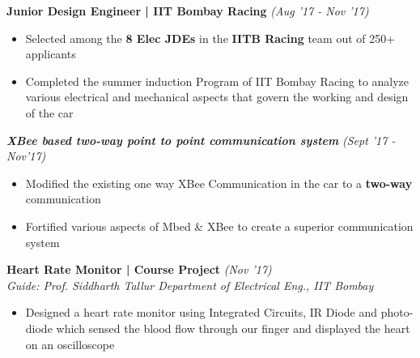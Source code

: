 \documentclass[11pt]{article}%
\begin{document}
{\flushleft \bf \large{Junior Design Engineer | IIT Bombay Racing}} \hfill  \hfill {{\em{(Aug '17 - Nov '17)} }}

\begin{itemize}
\vspace{-2mm}
\setlength\itemsep{0.01em}
\item Selected among the \textbf{8 Elec JDEs} in the \textbf{IITB Racing} team out of 250+ applicants
\item Completed the summer induction Program of IIT Bombay Racing to analyze various electrical and mechanical aspects that govern the working and design of the car 
\vspace{-1mm}
\end{itemize}





\vspace{-0.3cm}


{\flushleft \bf \em {\hspace{0.4cm}XBee based two-way point to point communication system}} \hfill {{\em{(Sept '17 - Nov'17)} }}
\begin{itemize}
\vspace{-1mm}
\setlength\itemsep{0.01em}
\item Modified the existing one way XBee Communication in the car to a \textbf{two-way} communication
\item Fortified various aspects of Mbed \& XBee to create a superior communication system
\vspace{-1mm}
\end{itemize}

{\flushleft \bf \large{Heart Rate Monitor | Course Project}} \hfill  \hfill {{\em{(Nov '17)} }}\\
{\em{Guide: Prof. Siddharth Tallur \textbar Department of Electrical Eng., IIT Bombay}}
\begin{itemize}
\vspace{-2mm}
\setlength\itemsep{0.01em}
\item Designed a heart rate monitor using Integrated Circuits, IR Diode and photo-diode which sensed the blood flow through our finger and displayed the heart on an oscilloscope
\vspace{-1mm}
\end{itemize}


\vspace{-0.2cm}
\end{document}
